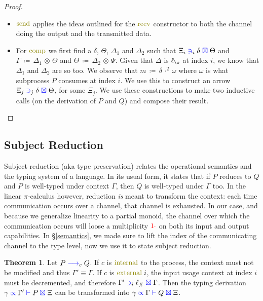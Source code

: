 \documentclass[a4paper,UKenglish,cleveref, autoref, thm-restate,authorcolumns]{lipics-v2019}
\theoremstyle{definition}
\newtheorem{nitheorem}[theorem]{Theorem}
\newcommand{\picalc}{$\pi$-calculus}
\newcommand{\type}[1]{\textcolor{blue}{\operatorname{#1}}}
\newcommand{\constr}[1]{\textcolor{olive}{\operatorname{#1}}}
\newcommand{\field}[1]{\textcolor{red}{\operatorname{#1}}}
\newcommand{\opsquared}[3]{#1 \, \coloneqq \, #2 \, \cdot^2 \, #3}
\newcommand{\opctx}[3]{#1 \, \coloneqq \, #2 \, \otimes \, #3}
\newcommand{\one}{\field{1\cdot}}
\newcommand{\lz}{\ell_{\o}}
\newcommand{\lio}{\ell_{\#}}
\newcommand{\reduce}[1]{\; \type{\longrightarrow}_{#1} \;}
\newcommand{\types}[4]{#1 \; \type{\propto} \; #2 \; \type{\vdash} \; #3 \; \type{\boxtimes} \; #4}
\newcommand{\containsusage}[4]{#1 \; \type{\ni}_{#2} \; #3 \; \type{\boxtimes} \; #4}
\begin{document}
\begin{proof}
\begin{itemize}
    \item
      $\constr{send}$ applies the ideas outlined for the $\constr{recv}$ constructor to both the channel doing the output and the transmitted data.

    \item
      For $\constr{comp}$ we first find a $\delta$, $\Theta$, $\Delta_1$ and $\Delta_2$ such that $\containsusage{\Xi_i}{i}{\delta}{\Theta}$ and $\opctx{\Gamma}{\Delta_1}{\Theta}$ and $\opctx{\Theta}{\Delta_2}{\Psi}$.
      Given that $\Delta$ is $\lz$ at index $i$, we know that $\Delta_1$ and $\Delta_2$ are so too.
      We observe that $\opsquared{m}{\delta}{\omega}$ where $\omega$ is what subprocess $P$ consumes at index $i$.
      We use this to construct an arrow $\containsusage{\Xi_j}{j}{\delta}{\Theta}$, for some $\Xi_j$.
      We use these constructions to make two inductive calls (on the derivation of $P$ and $Q$) and compose their result.
  \end{itemize}  
\end{proof}


\subsection{Subject Reduction}
\label{subject-reduction}

Subject reduction (aka type preservation) relates the operational semantics and the typing system of a language.
In its usual form, it states that if $P$ reduces to $Q$ and $P$ is well-typed under context $\Gamma$, then $Q$ is well-typed under $\Gamma$ too.
In the linear \picalc{} however, reduction \emph{is} meant to transform the context: each time communication occurs over a channel, that channel is exhausted.
In our case, and because we generalize linearity to a partial monoid, the channel over which the communication occurs will loose a multiplicity $\one$ on both its input and output capabilities.
In \S \ref{semantics}, we made sure to lift the index of the communicating channel to the type level, now we use it to state subject reduction.

\begin{nitheorem}
  Let $P \reduce{c} Q$.
  If $c$ is $\constr{internal}$ to the process, the context must not be modified and thus $\Gamma' \equiv \Gamma$.
  If $c$ is $\constr{external}\; i$, the input usage context at index $i$ must be decremented, and therefore $\containsusage{\Gamma'}{i}{\lio}{\Gamma}$.
  Then the typing derivation $\types{\gamma}{\Gamma'}{P}{\Xi}$ can be transformed into $\types{\gamma}{\Gamma}{Q}{\Xi}$.
\end{nitheorem}
\end{document}
